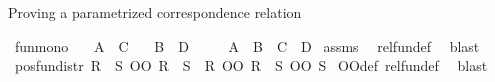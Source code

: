 \begin{isabellebody}
%
\begin{isamarkuptext}%
Proving a parametrized correspondence relation%
\end{isamarkuptext}\isamarkuptrue%
\isamarkupfalse%
\ fun{\isacharunderscore}{\kern0pt}mono{\isacharcolon}{\kern0pt}\isanewline
\ \ \ {\isachardoublequoteopen}A\ {\isasymge}\ C{\isachardoublequoteclose}\isanewline
\ \ \ {\isachardoublequoteopen}B\ {\isasymle}\ D{\isachardoublequoteclose}\isanewline
\ \ \ \ \ {\isachardoublequoteopen}{\isacharparenleft}{\kern0pt}A\ {\isacharequal}{\kern0pt}{\isacharequal}{\kern0pt}{\isacharequal}{\kern0pt}{\isachargreater}{\kern0pt}\ B{\isacharparenright}{\kern0pt}\ {\isasymle}\ {\isacharparenleft}{\kern0pt}C\ {\isacharequal}{\kern0pt}{\isacharequal}{\kern0pt}{\isacharequal}{\kern0pt}{\isachargreater}{\kern0pt}\ D{\isacharparenright}{\kern0pt}{\isachardoublequoteclose}\isanewline
%
\isadelimproof
%
\endisadelimproof
%
\isatagproof
{}\isamarkupfalse%
\ assms\ \isamarkupfalse%
\ rel{\isacharunderscore}{\kern0pt}fun{\isacharunderscore}{\kern0pt}def\ \isamarkupfalse%
\ blast%
\endisatagproof
{\isafoldproof}%
%
\isadelimproof
\isanewline
%
\endisadelimproof
\isanewline
{}\isamarkupfalse%
\ pos{\isacharunderscore}{\kern0pt}fun{\isacharunderscore}{\kern0pt}distr{\isacharcolon}{\kern0pt}\ {\isachardoublequoteopen}{\isacharparenleft}{\kern0pt}{\isacharparenleft}{\kern0pt}R\ {\isacharequal}{\kern0pt}{\isacharequal}{\kern0pt}{\isacharequal}{\kern0pt}{\isachargreater}{\kern0pt}\ S{\isacharparenright}{\kern0pt}\ OO\ {\isacharparenleft}{\kern0pt}R{\isacharprime}{\kern0pt}\ {\isacharequal}{\kern0pt}{\isacharequal}{\kern0pt}{\isacharequal}{\kern0pt}{\isachargreater}{\kern0pt}\ S{\isacharprime}{\kern0pt}{\isacharparenright}{\kern0pt}{\isacharparenright}{\kern0pt}\ {\isasymle}\ {\isacharparenleft}{\kern0pt}{\isacharparenleft}{\kern0pt}R\ OO\ R{\isacharprime}{\kern0pt}{\isacharparenright}{\kern0pt}\ {\isacharequal}{\kern0pt}{\isacharequal}{\kern0pt}{\isacharequal}{\kern0pt}{\isachargreater}{\kern0pt}\ {\isacharparenleft}{\kern0pt}S\ OO\ S{\isacharprime}{\kern0pt}{\isacharparenright}{\kern0pt}{\isacharparenright}{\kern0pt}{\isachardoublequoteclose}\isanewline
%
\isadelimproof
%
\endisadelimproof
%
\isatagproof
{}\isamarkupfalse%
\ OO{\isacharunderscore}{\kern0pt}def\ rel{\isacharunderscore}{\kern0pt}fun{\isacharunderscore}{\kern0pt}def\ \isamarkupfalse%
\ blast%
\endisatagproof
{\isafoldproof}%
%
\isadelimproof
\isanewline

\end{isabellebody}
